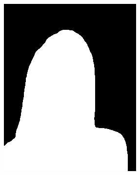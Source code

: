 \documentclass[11pt]{article}
\begin{document}
\begin{figure}[!h]
{\begin{minipage}[t]{0.2\linewidth}
  \centering
  \includegraphics[width=1\linewidth]{d2.png}
  \end{minipage}%
  }%
\end{figure}
\end{document}
